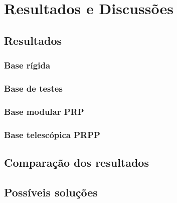 \chapter{Resultados e Discussões} \label{cap::resultados}



\section{Resultados} \label{sec::resultados}

\subsection{Base rígida} \label{sec::res_rigida}

\subsection{Base de testes} \label{sec::res_testes}

\subsection{Base modular PRP} \label{sec::res_prp}

\subsection{Base telescópica PRPP} \label{sec::res_prpp}


\section{Comparação dos resultados}


\section{Possíveis soluções}

